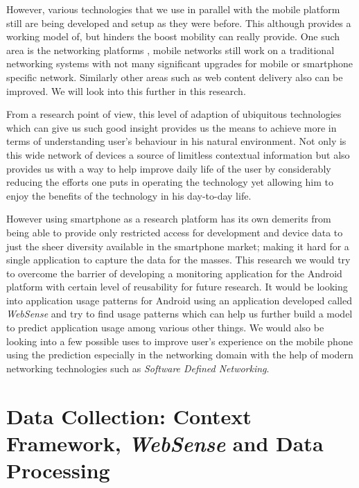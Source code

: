 \documentclass[prodmode,acmtecs]{acmsmall}
\begin{document}
However, various technologies that we use in parallel with the mobile platform still are being developed and setup as they were before. This although provides a working model of, but hinders the boost mobility can really provide. One such area is the networking platforms \cite{lee2014mesdn}, mobile networks still work on a traditional networking systems with not many significant upgrades for mobile or smartphone specific network. Similarly other areas such as web content delivery also can be improved. We will look into this further in this research.

From a research point of view, this level of adaption of ubiquitous technologies which can give us such good insight provides us the means to achieve more in terms of understanding user's behaviour in his natural environment. Not only is this wide network of devices a source of limitless contextual information \cite{campbell2008rise} but also provides us with a way to help improve daily life of the user by considerably reducing the efforts one puts in operating the technology yet allowing him to enjoy the benefits of the technology in his day-to-day life. 

However using smartphone as a research platform has its own demerits \cite{keshav2007cell,falaki2011systemsens} from being able to provide only restricted access for development and device data to just the sheer diversity available in the smartphone market; making it hard for a single application to capture the data for the masses. This research we would try to overcome the barrier of developing a monitoring application for the Android platform with certain level of reusability for future research. It would be looking into application usage patterns for Android using an application developed called \textit{WebSense} and try to find usage patterns which can help us further build a model to predict application usage among various other things. We would also be looking into a few possible uses to improve user's experience on the mobile phone using the prediction especially in the networking domain with the help of modern networking technologies such as \textit{Software Defined Networking}.

\section{Data Collection: Context Framework, \textit{WebSense} and Data Processing}
\label{collection}
\end{document}
